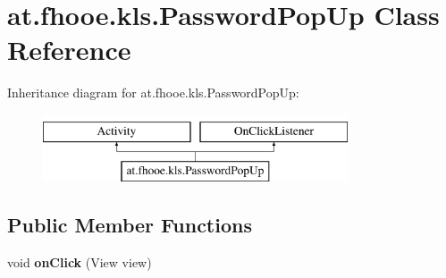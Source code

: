 \hypertarget{classat_1_1fhooe_1_1kls_1_1_password_pop_up}{\section{at.\-fhooe.\-kls.\-Password\-Pop\-Up Class Reference}
\label{classat_1_1fhooe_1_1kls_1_1_password_pop_up}
}
Inheritance diagram for at.\-fhooe.\-kls.\-Password\-Pop\-Up\-:\begin{figure}[H]
\begin{center}
\leavevmode
\includegraphics[height=2.000000cm]{classat_1_1fhooe_1_1kls_1_1_password_pop_up}
\end{center}
\end{figure}
\subsection*{Public Member Functions}
\begin{DoxyCompactItemize}
\item 
\hypertarget{classat_1_1fhooe_1_1kls_1_1_password_pop_up_a389d0a658e31d1fd3607bcb90f34b76a}{void {\bfseries on\-Click} (View view)}\label{classat_1_1fhooe_1_1kls_1_1_password_pop_up_a389d0a658e31d1fd3607bcb90f34b76a}

\end{DoxyCompactItemize}
